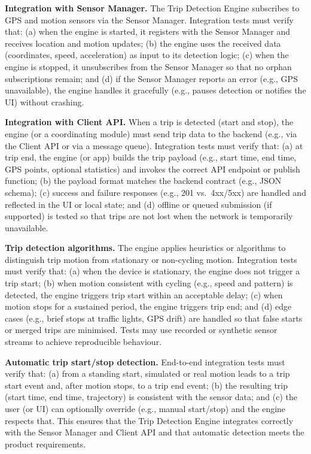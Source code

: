 \textbf{Integration with Sensor Manager.}
The Trip Detection Engine subscribes to GPS and motion sensors via the Sensor Manager. Integration tests must verify that: (a) when the engine is started, it registers with the Sensor Manager and receives location and motion updates; (b) the engine uses the received data (coordinates, speed, acceleration) as input to its detection logic; (c) when the engine is stopped, it unsubscribes from the Sensor Manager so that no orphan subscriptions remain; and (d) if the Sensor Manager reports an error (e.g., GPS unavailable), the engine handles it gracefully (e.g., pauses detection or notifies the UI) without crashing.

\textbf{Integration with Client API.}
When a trip is detected (start and stop), the engine (or a coordinating module) must send trip data to the backend (e.g., via the Client API or via a message queue). Integration tests must verify that: (a) at trip end, the engine (or app) builds the trip payload (e.g., start time, end time, GPS points, optional statistics) and invokes the correct API endpoint or publish function; (b) the payload format matches the backend contract (e.g., JSON schema); (c) success and failure responses (e.g., 201 vs.\ 4xx/5xx) are handled and reflected in the UI or local state; and (d) offline or queued submission (if supported) is tested so that trips are not lost when the network is temporarily unavailable.

\textbf{Trip detection algorithms.}
The engine applies heuristics or algorithms to distinguish trip motion from stationary or non-cycling motion. Integration tests must verify that: (a) when the device is stationary, the engine does not trigger a trip start; (b) when motion consistent with cycling (e.g., speed and pattern) is detected, the engine triggers trip start within an acceptable delay; (c) when motion stops for a sustained period, the engine triggers trip end; and (d) edge cases (e.g., brief stops at traffic lights, GPS drift) are handled so that false starts or merged trips are minimised. Tests may use recorded or synthetic sensor streams to achieve reproducible behaviour.

\textbf{Automatic trip start/stop detection.}
End-to-end integration tests must verify that: (a) from a standing start, simulated or real motion leads to a trip start event and, after motion stops, to a trip end event; (b) the resulting trip (start time, end time, trajectory) is consistent with the sensor data; and (c) the user (or UI) can optionally override (e.g., manual start/stop) and the engine respects that. This ensures that the Trip Detection Engine integrates correctly with the Sensor Manager and Client API and that automatic detection meets the product requirements.

